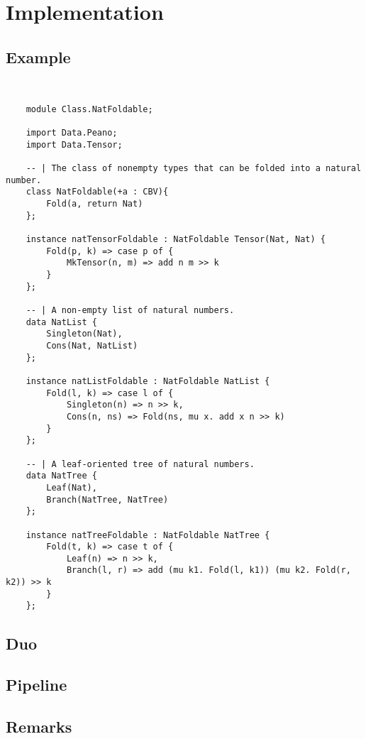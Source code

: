 \chapter{Implementation}
\label{ch:implementation}

\section{Example}

\begin{lstlisting}


    module Class.NatFoldable;

    import Data.Peano;
    import Data.Tensor;
    
    -- | The class of nonempty types that can be folded into a natural number.
    class NatFoldable(+a : CBV){
        Fold(a, return Nat)
    };
    
    instance natTensorFoldable : NatFoldable Tensor(Nat, Nat) {
        Fold(p, k) => case p of {
            MkTensor(n, m) => add n m >> k
        }
    };
    
    -- | A non-empty list of natural numbers.
    data NatList {
        Singleton(Nat),
        Cons(Nat, NatList)
    };
    
    instance natListFoldable : NatFoldable NatList {
        Fold(l, k) => case l of {
            Singleton(n) => n >> k,
            Cons(n, ns) => Fold(ns, mu x. add x n >> k)
        }
    };
    
    -- | A leaf-oriented tree of natural numbers.
    data NatTree {
        Leaf(Nat),
        Branch(NatTree, NatTree)
    };
    
    instance natTreeFoldable : NatFoldable NatTree {
        Fold(t, k) => case t of {
            Leaf(n) => n >> k,
            Branch(l, r) => add (mu k1. Fold(l, k1)) (mu k2. Fold(r, k2)) >> k
        }
    };

\end{lstlisting}

\section{Duo}



\section{Pipeline}


\section{Remarks}

